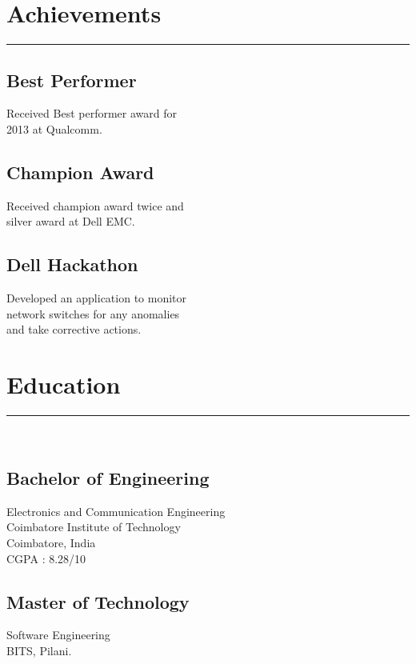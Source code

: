 \documentclass[]{mariappan-resume}
\begin{document}
\begin{minipage}[t]{0.33\textwidth}
\sectionsep
\section{Achievements}
\noindent\rule[3mm]{5cm}{0.4pt}

\subsection{Best Performer}
Received Best performer award for\\
2013 at Qualcomm.
\vspace{6pt}

\subsection{Champion Award}
Received champion award twice and\\
silver award at Dell EMC.
\vspace{6pt}

\subsection{Dell Hackathon}
Developed an application to monitor\\
network switches for any anomalies\\
and take corrective actions.

\sectionsep
\section{Education} 
\noindent\rule[3mm]{5cm}{0.4pt}\\
\subsection{Bachelor of Engineering} 
Electronics and Communication Engineering \\
Coimbatore Institute of Technology \\
Coimbatore, India \\
CGPA : 8.28/10\\
\vspace{8pt}

\subsection{Master of Technology} 
Software Engineering \\
BITS, Pilani. 

\vspace{8pt}

\sectionsep
%
%

\end{minipage} 
\end{document}

